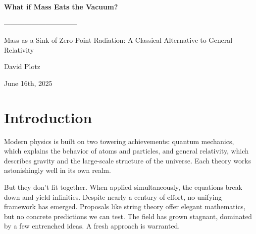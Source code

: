 \documentclass {article}
\begin{document}
\thispagestyle{empty}%

\begin{center}\strut
	\bfseries\Huge
	What if  Mass Eats the Vacuum? 

--------------------------------


	Mass as a Sink of Zero-Point Radiation: A Classical Alternative to General Relativity
\end{center}


\centerline{David Plotz}


\begin{center}\strut
June 16th, 2025
\end{center}
\vfill

	
\newpage
\begin{abstract}
	This paper introduces a classical field theory of gravity built on the Maxwell equations and a central physical hypothesis: that mass absorbs zero-point radiation, inducing a net inward momentum flow. Drawing from stochastic electrodynamics (SED), we postulate a Lorentz-invariant radiation field present throughout space and hypothesize that mass acts as a sink for this field.  We construct a consistent model of a massive particle, demonstrate energy and momentum conservation, and derive an emergent Dirac equation via a spinor transformation. Classical tests of general relativity, inlcuding Mercury's precession, gravitational lensing, and gravitational redshift, are reproduced to leading order. This approach provides a novel, Lorentz-invariant, classical alternative to quantum gravity and general relativity, and lays a foundation for further exploration.
\end{abstract}
\newpage

\section{Introduction}

Modern physics is built on two towering achievements: quantum mechanics, which explains the behavior of atoms and particles, and general relativity, which describes gravity and the large-scale structure of the universe. Each theory works astonishingly well in its own realm.

But they don’t fit together. When applied simultaneously, the equations break down and yield infinities. Despite nearly a century of effort, no unifying framework has emerged. Proposals like string theory offer elegant mathematics, but no concrete predictions we can test. The field has grown stagnant, dominated by a few entrenched ideas. A fresh approach is warranted.
\end{document}
